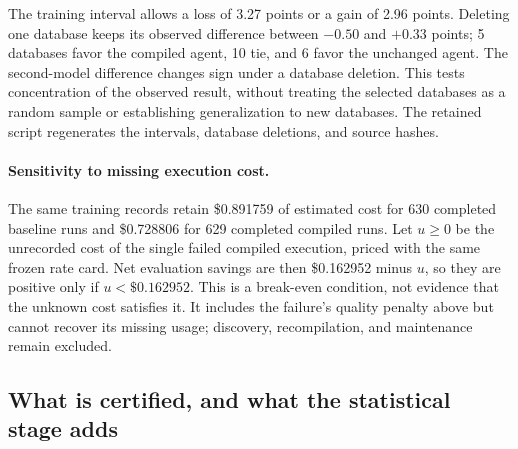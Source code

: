 \begin{table}[t]
  \centering
  \caption{Retrospective BIRD quality sensitivity on all scheduled questions.
  All differences are compiled minus unchanged, in percentage points.
  Intervals assume i.i.d.\ question pairs. ``Delete-one'' omits each entire
  database in turn; it is a descriptive range, not a confidence interval.
  The last column counts databases with positive, zero, or negative differences.}
  \label{tab:bird-quality-sensitivity}
  \footnotesize
  \resizebox{\linewidth}{!}{}
\end{table}

The training interval allows a loss of 3.27 points or a gain of 2.96 points.
Deleting one database keeps its observed difference between $-0.50$ and
$+0.33$ points; 5 databases favor the compiled agent, 10 tie, and 6 favor the
unchanged agent. The second-model difference changes sign under a database
deletion. This tests concentration of the observed result, without treating
the selected databases as a random sample or establishing generalization to
new databases. The retained script 
regenerates the intervals, database deletions, and source hashes.

\paragraph{Sensitivity to missing execution cost.}
The same training records retain \$0.891759 of estimated cost for 630 completed
baseline runs and \$0.728806 for 629 completed compiled runs. Let $u\ge0$ be
the unrecorded cost of the single failed compiled execution, priced with the
same frozen rate card. Net evaluation savings are then
\$0.162952 minus $u$, so they are positive only if $u<\$0.162952$.
This is a break-even condition, not evidence that the unknown cost satisfies
it. It includes the failure's quality penalty above but cannot recover its
missing usage; discovery, recompilation, and maintenance remain excluded.

\subsection{What is certified, and what the statistical stage adds}
\label{app:certificates}

\begin{table}[t]
  \centering
  \caption{Every admitted artifact's certificate. $m$ counts candidates that
  reached calibration; a parenthesized bound uses the candidate-wide budget
  $\gamma=\delta/(m|\Lambda|)$ or, for the post-cutoff row, the primary grid. All
  bounds assume i.i.d.\ groups from the labeled population, not automatically
  the deployment population; the replay event has no observed occurrence on
  the GitHub cohorts as labeled (\cref{sec:method}).}
  \label{tab:certificates}
  \footnotesize
  \setlength{\tabcolsep}{3pt}
  
\end{table}

